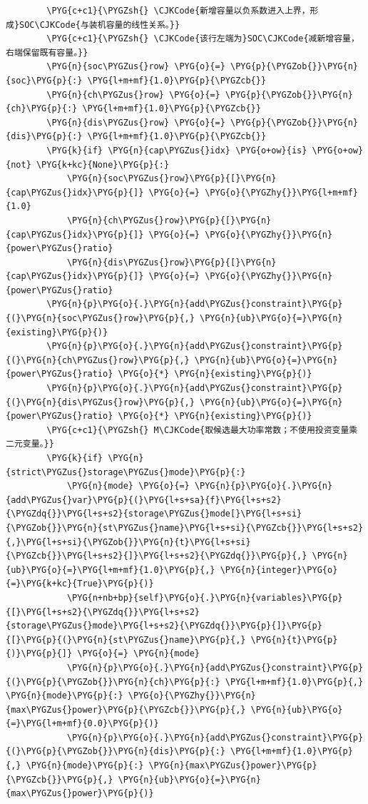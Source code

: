 \begin{Verbatim}
        \PYG{c+c1}{\PYGZsh{} \CJKCode{新增容量以负系数进入上界，形成}SOC\CJKCode{与装机容量的线性关系。}}
        \PYG{c+c1}{\PYGZsh{} \CJKCode{该行左端为}SOC\CJKCode{减新增容量，右端保留既有容量。}}
        \PYG{n}{soc\PYGZus{}row} \PYG{o}{=} \PYG{p}{\PYGZob{}}\PYG{n}{soc}\PYG{p}{:} \PYG{l+m+mf}{1.0}\PYG{p}{\PYGZcb{}}
        \PYG{n}{ch\PYGZus{}row} \PYG{o}{=} \PYG{p}{\PYGZob{}}\PYG{n}{ch}\PYG{p}{:} \PYG{l+m+mf}{1.0}\PYG{p}{\PYGZcb{}}
        \PYG{n}{dis\PYGZus{}row} \PYG{o}{=} \PYG{p}{\PYGZob{}}\PYG{n}{dis}\PYG{p}{:} \PYG{l+m+mf}{1.0}\PYG{p}{\PYGZcb{}}
        \PYG{k}{if} \PYG{n}{cap\PYGZus{}idx} \PYG{o+ow}{is} \PYG{o+ow}{not} \PYG{k+kc}{None}\PYG{p}{:}
            \PYG{n}{soc\PYGZus{}row}\PYG{p}{[}\PYG{n}{cap\PYGZus{}idx}\PYG{p}{]} \PYG{o}{=} \PYG{o}{\PYGZhy{}}\PYG{l+m+mf}{1.0}
            \PYG{n}{ch\PYGZus{}row}\PYG{p}{[}\PYG{n}{cap\PYGZus{}idx}\PYG{p}{]} \PYG{o}{=} \PYG{o}{\PYGZhy{}}\PYG{n}{power\PYGZus{}ratio}
            \PYG{n}{dis\PYGZus{}row}\PYG{p}{[}\PYG{n}{cap\PYGZus{}idx}\PYG{p}{]} \PYG{o}{=} \PYG{o}{\PYGZhy{}}\PYG{n}{power\PYGZus{}ratio}
        \PYG{n}{p}\PYG{o}{.}\PYG{n}{add\PYGZus{}constraint}\PYG{p}{(}\PYG{n}{soc\PYGZus{}row}\PYG{p}{,} \PYG{n}{ub}\PYG{o}{=}\PYG{n}{existing}\PYG{p}{)}
        \PYG{n}{p}\PYG{o}{.}\PYG{n}{add\PYGZus{}constraint}\PYG{p}{(}\PYG{n}{ch\PYGZus{}row}\PYG{p}{,} \PYG{n}{ub}\PYG{o}{=}\PYG{n}{power\PYGZus{}ratio} \PYG{o}{*} \PYG{n}{existing}\PYG{p}{)}
        \PYG{n}{p}\PYG{o}{.}\PYG{n}{add\PYGZus{}constraint}\PYG{p}{(}\PYG{n}{dis\PYGZus{}row}\PYG{p}{,} \PYG{n}{ub}\PYG{o}{=}\PYG{n}{power\PYGZus{}ratio} \PYG{o}{*} \PYG{n}{existing}\PYG{p}{)}
        \PYG{c+c1}{\PYGZsh{} M\CJKCode{取候选最大功率常数；不使用投资变量乘二元变量。}}
        \PYG{k}{if} \PYG{n}{strict\PYGZus{}storage\PYGZus{}mode}\PYG{p}{:}
            \PYG{n}{mode} \PYG{o}{=} \PYG{n}{p}\PYG{o}{.}\PYG{n}{add\PYGZus{}var}\PYG{p}{(}\PYG{l+s+sa}{f}\PYG{l+s+s2}{\PYGZdq{}}\PYG{l+s+s2}{storage\PYGZus{}mode[}\PYG{l+s+si}{\PYGZob{}}\PYG{n}{st\PYGZus{}name}\PYG{l+s+si}{\PYGZcb{}}\PYG{l+s+s2}{,}\PYG{l+s+si}{\PYGZob{}}\PYG{n}{t}\PYG{l+s+si}{\PYGZcb{}}\PYG{l+s+s2}{]}\PYG{l+s+s2}{\PYGZdq{}}\PYG{p}{,} \PYG{n}{ub}\PYG{o}{=}\PYG{l+m+mf}{1.0}\PYG{p}{,} \PYG{n}{integer}\PYG{o}{=}\PYG{k+kc}{True}\PYG{p}{)}
            \PYG{n+nb+bp}{self}\PYG{o}{.}\PYG{n}{variables}\PYG{p}{[}\PYG{l+s+s2}{\PYGZdq{}}\PYG{l+s+s2}{storage\PYGZus{}mode}\PYG{l+s+s2}{\PYGZdq{}}\PYG{p}{]}\PYG{p}{[}\PYG{p}{(}\PYG{n}{st\PYGZus{}name}\PYG{p}{,} \PYG{n}{t}\PYG{p}{)}\PYG{p}{]} \PYG{o}{=} \PYG{n}{mode}
            \PYG{n}{p}\PYG{o}{.}\PYG{n}{add\PYGZus{}constraint}\PYG{p}{(}\PYG{p}{\PYGZob{}}\PYG{n}{ch}\PYG{p}{:} \PYG{l+m+mf}{1.0}\PYG{p}{,} \PYG{n}{mode}\PYG{p}{:} \PYG{o}{\PYGZhy{}}\PYG{n}{max\PYGZus{}power}\PYG{p}{\PYGZcb{}}\PYG{p}{,} \PYG{n}{ub}\PYG{o}{=}\PYG{l+m+mf}{0.0}\PYG{p}{)}
            \PYG{n}{p}\PYG{o}{.}\PYG{n}{add\PYGZus{}constraint}\PYG{p}{(}\PYG{p}{\PYGZob{}}\PYG{n}{dis}\PYG{p}{:} \PYG{l+m+mf}{1.0}\PYG{p}{,} \PYG{n}{mode}\PYG{p}{:} \PYG{n}{max\PYGZus{}power}\PYG{p}{\PYGZcb{}}\PYG{p}{,} \PYG{n}{ub}\PYG{o}{=}\PYG{n}{max\PYGZus{}power}\PYG{p}{)}


\end{Verbatim}
